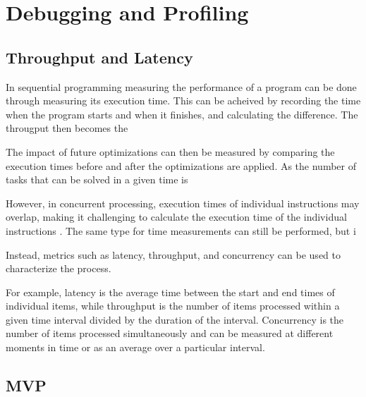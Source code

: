
\section{Debugging and Profiling}

\subsection{Throughput and Latency}
In sequential programming measuring the performance of a program can be done through measuring its execution time.
This can be acheived by recording the time when the program starts and when it finishes, and calculating the difference.
The througput then becomes the

The impact of future optimizations can then be measured by comparing the execution times before and after the optimizations are applied.
As the number of tasks that can be solved in a given time is

However, in concurrent processing, execution times of individual instructions may overlap, making it challenging to calculate the execution time of the individual instructions \cite[21]{volkovLatencyHiding2016}.
The same type for time measurements can still be performed, but i

Instead, metrics such as latency, throughput, and concurrency can be used to characterize the process.

For example, latency is the average time between the start and end times of individual items, while throughput is the number of items processed within a given time interval divided by the duration of the interval.
Concurrency is the number of items processed simultaneously and can be measured at different moments in time or as an average over a particular interval.

\subsection{MVP}

